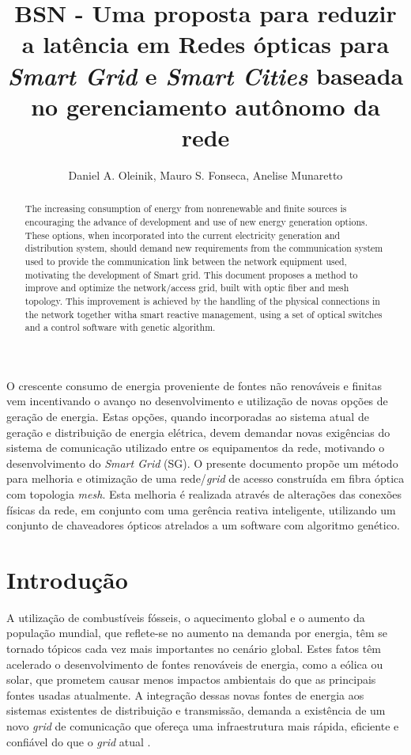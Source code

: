 \documentclass[12pt]{article}
\title{BSN - Uma proposta para reduzir a latência em Redes ópticas para \emph{Smart Grid} e \emph{Smart Cities} baseada no gerenciamento autônomo da rede}
\author{Daniel A. Oleinik\inst{1}, Mauro S. Fonseca\inst{1}, Anelise Munaretto\inst{1}}
\begin{document}
 

\maketitle

\begin{abstract}
  The increasing consumption of energy from nonrenewable and finite sources is encouraging the advance of development and use
of new energy generation options. These options, when incorporated into the current electricity generation and distribution system,
should demand new requirements from the communication system used to provide the communication link between the network
equipment used, motivating the development of Smart grid. This document proposes a method to improve and optimize the network/access grid, built with optic fiber and mesh topology. This improvement is achieved by the handling of the physical connections in the network together witha smart reactive management, using a set of optical switches and a control software with genetic algorithm.
\end{abstract}
     
\begin{resumo} 
 O crescente consumo de energia proveniente de fontes não renováveis e finitas vem incentivando o avanço no desenvolvimento e utilização de novas opções de geração de energia. Estas opções, quando incorporadas ao sistema atual de geração e distribuição de energia elétrica, devem demandar novas exigências do sistema de comunicação utilizado entre os equipamentos da rede, motivando o desenvolvimento do \emph{Smart Grid} (SG). O presente documento propõe um método para melhoria e otimização de uma rede/\emph{grid} de acesso construída em fibra óptica com topologia \emph{mesh}. Esta melhoria é realizada através de alterações das conexões físicas da rede, em conjunto com uma gerência reativa inteligente, utilizando um conjunto de chaveadores ópticos atrelados a um software com algoritmo genético.
\end{resumo}


\section{Introdução}

A utilização de combustíveis fósseis, o aquecimento global e o aumento da população mundial, que reflete-se no aumento na demanda por energia, têm se tornado tópicos cada vez mais importantes no cenário global. Estes fatos têm acelerado o desenvolvimento de fontes renováveis de energia, como a eólica ou solar, que prometem causar menos impactos ambientais do que as principais fontes usadas atualmente. A integração dessas novas fontes de energia aos sistemas existentes de distribuição e transmissão, demanda a existência de um novo \emph{grid} de comunicação que ofereça uma infraestrutura mais rápida, eficiente e confiável do que o \emph{grid} atual \cite{Art_Gungor2013}.
\end{document}
